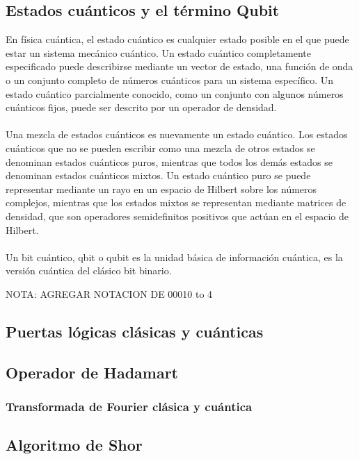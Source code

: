 \subsection{Estados cuánticos y el término Qubit}
En física cuántica, el estado cuántico es cualquier estado posible en el que puede estar un sistema mecánico cuántico. Un estado cuántico completamente especificado puede describirse mediante un vector de estado, una función de onda o un conjunto completo de números cuánticos para un sistema específico. Un estado cuántico parcialmente conocido, como un conjunto con algunos números cuánticos fijos, puede ser descrito por un operador de densidad.\\\\
Una mezcla de estados cuánticos es nuevamente un estado cuántico. Los estados cuánticos que no se pueden escribir como una mezcla de otros estados se denominan estados cuánticos puros, mientras que todos los demás estados se denominan estados cuánticos mixtos. Un estado cuántico puro se puede representar mediante un rayo en un espacio de Hilbert sobre los números complejos, mientras que los estados mixtos se representan mediante matrices de densidad, que son operadores semidefinitos positivos que actúan en el espacio de Hilbert.\\\\
Un bit cuántico, qbit o qubit es la unidad básica de información cuántica, es la versión cuántica del clásico bit binario.
\begin{center}
    NOTA: AGREGAR NOTACION DE 00010 to 4
\end{center}
\subsection{Puertas lógicas clásicas y cuánticas}
\subsection{Operador de Hadamart}
\subsubsection{Transformada de Fourier clásica y cuántica}
\subsection{Algoritmo de Shor}
